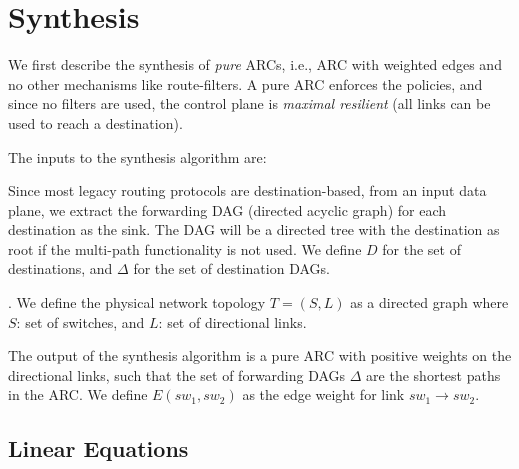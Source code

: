 \section{Synthesis}
We first describe the synthesis of {\em pure} ARCs, i.e., 
ARC with weighted edges and no other mechanisms like route-filters.
A pure ARC enforces the policies, and since no filters are used, the
control plane is {\em maximal resilient} (all links can be used 
to reach a destination). 

The inputs to the synthesis algorithm are:

Since most legacy routing protocols are destination-based,
from an input data plane, we extract the forwarding
DAG (directed acyclic graph) for each destination
as the sink. The DAG will be a directed tree with the
destination as root if the multi-path
functionality is not used. We define $D$ for the 
set of destinations, and $\Delta$ for  
the set of destination DAGs. 

. 
We define the physical network topology $T = (S, L)$
as a directed graph where $S$: set of switches, and 
$L$: set of directional links. 

The output of the synthesis algorithm is a 
pure ARC with positive weights on the directional links,
such that the set of forwarding DAGs $\Delta$ are the 
shortest paths in the ARC. We define $E(sw_1, sw_2)$ as
the edge weight for link $sw_1 \rightarrow sw_2$. 

\subsection{Linear Equations}
